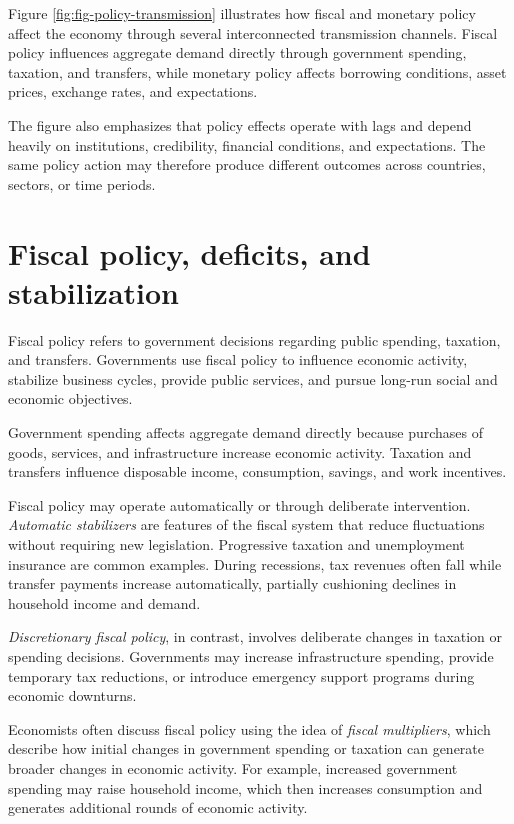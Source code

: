 \documentclass[
  11pt,
  oneside]{book}
\begin{document}
Figure \ref{fig:fig-policy-transmission} illustrates how fiscal and monetary policy affect the economy through several interconnected transmission channels. Fiscal policy influences aggregate demand directly through government spending, taxation, and transfers, while monetary policy affects borrowing conditions, asset prices, exchange rates, and expectations.

The figure also emphasizes that policy effects operate with lags and depend heavily on institutions, credibility, financial conditions, and expectations. The same policy action may therefore produce different outcomes across countries, sectors, or time periods.

\section{Fiscal policy, deficits, and stabilization}\label{fiscal-policy-deficits-and-stabilization}

Fiscal policy refers to government decisions regarding public spending, taxation, and transfers. Governments use fiscal policy to influence economic activity, stabilize business cycles, provide public services, and pursue long-run social and economic objectives.

Government spending affects aggregate demand directly because purchases of goods, services, and infrastructure increase economic activity. Taxation and transfers influence disposable income, consumption, savings, and work incentives.

Fiscal policy may operate automatically or through deliberate intervention. \emph{Automatic stabilizers} are features of the fiscal system that reduce fluctuations without requiring new legislation. Progressive taxation and unemployment insurance are common examples. During recessions, tax revenues often fall while transfer payments increase automatically, partially cushioning declines in household income and demand.

\emph{Discretionary fiscal policy}, in contrast, involves deliberate changes in taxation or spending decisions. Governments may increase infrastructure spending, provide temporary tax reductions, or introduce emergency support programs during economic downturns.

Economists often discuss fiscal policy using the idea of \emph{fiscal multipliers}, which describe how initial changes in government spending or taxation can generate broader changes in economic activity. For example, increased government spending may raise household income, which then increases consumption and generates additional rounds of economic activity.
\end{document}
